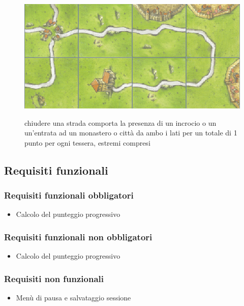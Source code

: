 \begin{figure}[]
    {\includegraphics[]{images/Strada.png}}

    \caption{chiudere una strada comporta la presenza di un incrocio o un un’entrata ad un monastero o città da ambo i lati per un totale di 1 punto per ogni tessera, estremi compresi}
\end{figure}

\subsection*{Requisiti funzionali}
\subsubsection*{Requisiti funzionali obbligatori}
\begin{itemize}
\item Calcolo del punteggio progressivo
\end{itemize}
\subsubsection*{Requisiti funzionali non obbligatori}
\begin{itemize}
\item Calcolo del punteggio progressivo
\end{itemize}

\subsubsection*{Requisiti non funzionali}
\begin{itemize}
\item Menù di pausa e salvataggio sessione
\end{itemize}


